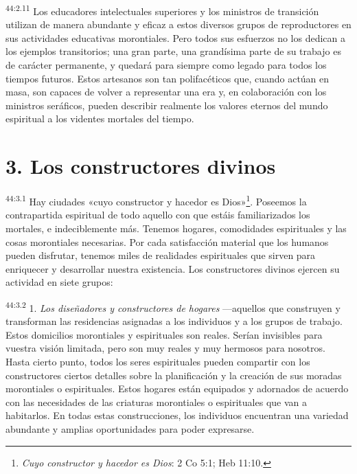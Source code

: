 \par
\textsuperscript{44:2.11} Los educadores intelectuales superiores y los ministros de transición utilizan de manera abundante y eficaz a estos diversos grupos de reproductores en sus actividades educativas morontiales. Pero todos sus esfuerzos no los dedican a los ejemplos transitorios; una gran parte, una grandísima parte de su trabajo es de carácter permanente, y quedará para siempre como legado para todos los tiempos futuros. Estos artesanos son tan polifacéticos que, cuando actúan en masa, son capaces de volver a representar una era y, en colaboración con los ministros seráficos, pueden describir realmente los valores eternos del mundo espiritual a los videntes mortales del tiempo.

\section*{3. Los constructores divinos}
\par
\textsuperscript{44:3.1} Hay ciudades «cuyo constructor y hacedor es Dios»\footnote{\textit{Cuyo constructor y hacedor es Dios}: 2 Co 5:1; Heb 11:10.}. Poseemos la contrapartida espiritual de todo aquello con que estáis familiarizados los mortales, e indeciblemente más. Tenemos hogares, comodidades espirituales y las cosas morontiales necesarias. Por cada satisfacción material que los humanos pueden disfrutar, tenemos miles de realidades espirituales que sirven para enriquecer y desarrollar nuestra existencia. Los constructores divinos ejercen su actividad en siete grupos:

\par
\textsuperscript{44:3.2} 1. \textit{Los diseñadores y constructores de hogares} ---aquellos que construyen y transforman las residencias asignadas a los individuos y a los grupos de trabajo. Estos domicilios morontiales y espirituales son reales. Serían invisibles para vuestra visión limitada, pero son muy reales y muy hermosos para nosotros. Hasta cierto punto, todos los seres espirituales pueden compartir con los constructores ciertos detalles sobre la planificación y la creación de sus moradas morontiales o espirituales. Estos hogares están equipados y adornados de acuerdo con las necesidades de las criaturas morontiales o espirituales que van a habitarlos. En todas estas construcciones, los individuos encuentran una variedad abundante y amplias oportunidades para poder expresarse.

